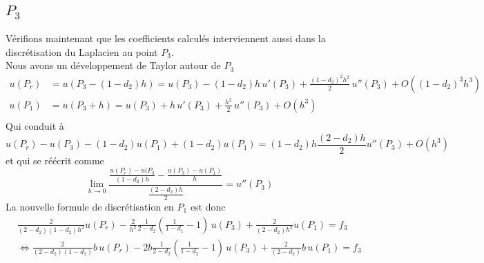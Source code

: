\documentclass[11pt,a4paper]{article}
\begin{document}
\subsection{$P_3$}
Vérifions maintenant que les coefficients calculés interviennent aussi dans la discrétisation du Laplacien au point $P_3$.\\
Nous avons un développement de Taylor autour de $P_3$
\begin{align*}
u (P_r) &= u \left(P_3-(1-d_2)h\right) = u \left(P_3\right) - (1-d_2)h\,u'\left(P_3\right) + \frac{(1-d_2)^2h^2}{2}\,u''\left(P_3\right) + O\left((1-d_2)^3h^3\right)\\
u \left(P_1\right) &= u \left(P_3+h\right) = u \left(P_3\right) + h\,u'\left(P_3\right) + \frac{h^2}{2}\,u''(P_3) + O\left(h^3\right)\\
\end{align*}
Qui conduit à
\begin{equation}
u \left(P_r\right) - u\left(P_3\right) - (1-d_2)u\left(P_1\right) +  (1-d_2)u (P_1) = (1-d_2)h\frac{(2-d_2)h}{2}u''\left(P_3\right) + O(h^3)
\end{equation}
et qui se réécrit comme
\begin{equation}
\lim_{h\to0}\frac{\frac{u(P_r)- u (P_3}{(1-d_2)h} - \frac{u (P_3) - u (P_1)}{h}}{\frac{(2-d_2)h}{2}} = u''(P_3)
\end{equation}
La nouvelle formule de discrétisation en $P_1$ est donc
\begin{align*}
& \frac{2}{(2- d_2)(1-d_2)h^2}u(P_r) - \frac{2}{h^2}\frac{1}{2-d_2}\left(\frac{1}{1-d_1} - 1\right)\,u(P_3) + \frac{2}{(2-d_2)h^2}u(P_1) = f_3\\
& \Longleftrightarrow \frac{2}{(2-d_2)(1-d_2)}b\,u(P_r) - 2b\frac{1}{2-d_2}\left(\frac{1}{1-d_2} - 1\right)\,u(P_3) + \frac{2}{(2-d_2)}b\,u(P_1) = f_3
\end{align*}
\end{document}
